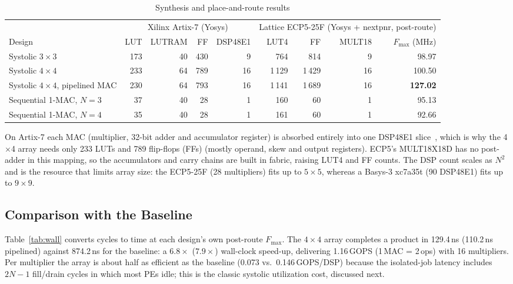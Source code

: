 \documentclass[conference]{IEEEtran}
\begin{document}
\begin{table}[t]
\centering
\caption{Synthesis and place-and-route results}
\label{tab:res}
\begin{tabular}{@{}lrrrrrrrr@{}}
\toprule
& \multicolumn{4}{c}{Xilinx Artix-7 (Yosys)} & \multicolumn{4}{c}{Lattice ECP5-25F (Yosys + nextpnr, post-route)}\\
\cmidrule(lr){2-5}\cmidrule(l){6-9}
Design & LUT & LUTRAM & FF & DSP48E1 & LUT4 & FF & MULT18 & $F_{\max}$ (MHz)\\
\midrule
Systolic $3\times3$                 & 173 & 40 & 430 & 9  & 764   & 814   & 9  & 98.97\\
Systolic $4\times4$                 & 233 & 64 & 789 & 16 & 1\,129 & 1\,429 & 16 & 100.50\\
Systolic $4\times4$, pipelined MAC  & 230 & 64 & 793 & 16 & 1\,141 & 1\,689 & 16 & \textbf{127.02}\\
Sequential 1-MAC, $N=3$             & 37  & 40 & 28  & 1  & 160   & 60    & 1  & 95.13\\
Sequential 1-MAC, $N=4$             & 35  & 40 & 28  & 1  & 161   & 60    & 1  & 92.66\\
\bottomrule
\end{tabular}
\end{table}

On Artix-7 each MAC (multiplier, 32-bit adder and accumulator register) is
absorbed entirely into one DSP48E1 slice~\cite{xilinx2018dsp48}, which is why
the 4$\times$4 array needs only 233 LUTs and 789 flip-flops (FFs) (mostly operand,
skew and output registers). ECP5's MULT18X18D has no post-adder in this
mapping, so the accumulators and carry chains are built in fabric, raising
LUT4 and FF counts. The DSP count scales as $N^2$ and is the resource that
limits array size: the ECP5-25F (28 multipliers) fits up to $5\times5$,
whereas a Basys-3 xc7a35t (90 DSP48E1) fits up to $9\times9$.

\subsection{Comparison with the Baseline}
Table~\ref{tab:wall} converts cycles to time at each design's own post-route
$F_{\max}$. The $4\times4$ array completes a product in 129.4\,ns (110.2\,ns
pipelined) against 874.2\,ns for the baseline: a $6.8\times$ ($7.9\times$)
wall-clock speed-up, delivering 1.16\,GOPS (1\,MAC = 2\,ops) with 16 multipliers.
Per multiplier the array is about half as efficient as the baseline
(0.073 vs.\ 0.146\,GOPS/DSP) because the isolated-job latency includes
$2N-1$ fill/drain cycles in which most PEs idle; this is the classic
systolic utilization cost, discussed next.
\end{document}
